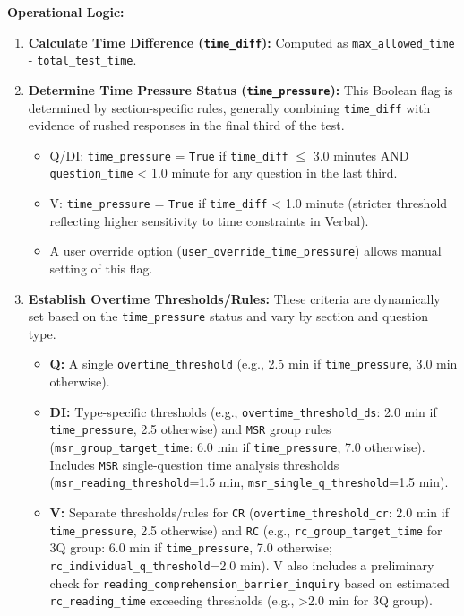 \documentclass{article}
\begin{document}
\textbf{Operational Logic:}
\begin{enumerate}
    \item \textbf{Calculate Time Difference (\texttt{time\_diff}):} Computed as \texttt{max\_allowed\_time} - \texttt{total\_test\_time}.
    \item \textbf{Determine Time Pressure Status (\texttt{time\_pressure}):} This Boolean flag is determined by section-specific rules, generally combining \texttt{time\_diff} with evidence of rushed responses in the final third of the test.
    \begin{itemize}
        \item Q/DI: \texttt{time\_pressure} = \texttt{True} if \texttt{time\_diff} $\leq$ 3.0 minutes AND \texttt{question\_time} < 1.0 minute for any question in the last third.
        \item V: \texttt{time\_pressure} = \texttt{True} if \texttt{time\_diff} < 1.0 minute (stricter threshold reflecting higher sensitivity to time constraints in Verbal).
        \item A user override option (\texttt{user\_override\_time\_pressure}) allows manual setting of this flag.
    \end{itemize}
    \item \textbf{Establish Overtime Thresholds/Rules:} These criteria are dynamically set based on the \texttt{time\_pressure} status and vary by section and question type.
    \begin{itemize}
        \item \textbf{Q:} A single \texttt{overtime\_threshold} (e.g., 2.5 min if \texttt{time\_pressure}, 3.0 min otherwise).
        \item \textbf{DI:} Type-specific thresholds (e.g., \texttt{overtime\_threshold\_ds}: 2.0 min if \texttt{time\_pressure}, 2.5 otherwise) and \texttt{MSR} group rules (\texttt{msr\_group\_target\_time}: 6.0 min if \texttt{time\_pressure}, 7.0 otherwise). Includes \texttt{MSR} single-question time analysis thresholds (\texttt{msr\_reading\_threshold}=1.5 min, \texttt{msr\_single\_q\_threshold}=1.5 min).
        \item \textbf{V:} Separate thresholds/rules for \texttt{CR} (\texttt{overtime\_threshold\_cr}: 2.0 min if \texttt{time\_pressure}, 2.5 otherwise) and \texttt{RC} (e.g., \texttt{rc\_group\_target\_time} for 3Q group: 6.0 min if \texttt{time\_pressure}, 7.0 otherwise; \texttt{rc\_individual\_q\_threshold}=2.0 min). V also includes a preliminary check for \texttt{reading\_comprehension\_barrier\_inquiry} based on estimated \texttt{rc\_reading\_time} exceeding thresholds (e.g., >2.0 min for 3Q group).

\end{itemize}
\end{enumerate}
\end{document}
